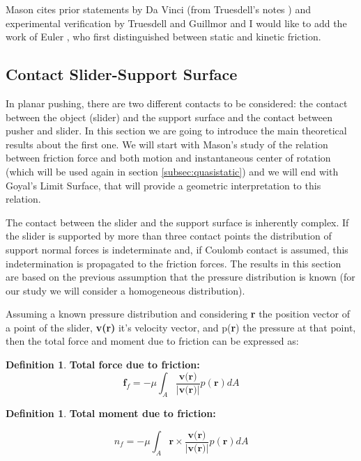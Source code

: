 \documentclass[12,twoside]{TFG-GM}
\theoremstyle{definition}
\newtheorem{definition}[theorem]{Definition}
\theoremstyle{remark}
\begin{document}
Mason cites prior statements by Da Vinci (from Truesdell's notes \cite{da_vinci}) and experimental verification by Truesdell and Guillmor \cite{gillmor} and I would like to add the work of Euler \cite{euler}, who first distinguished between static and kinetic friction.

\subsection{Contact Slider-Support Surface}
\label{subsec:planar_sliding}
In planar pushing, there are two different contacts to be considered: the contact between the object (slider) and the support surface and the contact between pusher and slider. In this section we are going to introduce the main theoretical results about the first one. We will start with Mason's study of the relation between friction force and both motion and instantaneous center of rotation (which will be used again in section \ref{subsec:quasistatic}) and we will end with Goyal's Limit Surface, that will provide a geometric interpretation to this relation.

The contact between the slider and the support surface is inherently complex. If the slider is supported by more than three contact points the distribution of support normal forces is indeterminate and, if Coulomb contact is assumed, this indetermination is propagated to the friction forces. The results in this section are based on the previous assumption that the pressure distribution is known (for our study we will consider a homogeneous distribution).

Assuming a known pressure distribution and considering \textbf{r} the position vector of a point of the slider, \textbf{v(r)} it's velocity vector, and p(\textbf{r}) the pressure at that point, then the total force and moment due to friction can be expressed as:
\begin{definition} \textbf{Total force due to friction:} 
\begin{equation}
\textbf{f}_f = - \mu \int_A \dfrac{\textbf{v(r)}}{|\textbf{v(r)}|} p(\textbf{r}) dA
\end{equation}
\end{definition}
\begin{definition} \textbf{Total moment due to friction:}

\begin{equation}
n_f = - \mu \int_A \textbf{r} \times \dfrac{\textbf{v(r)}}{|\textbf{v(r)}|} p(\textbf{r}) dA
\end{equation}
\end{definition}
\end{document}

